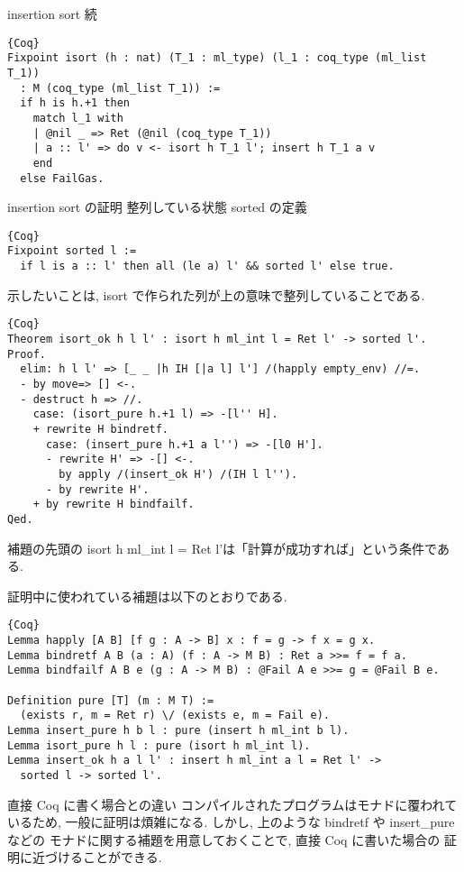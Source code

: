 \documentclass[unicode,mathserif]{beamer}
\begin{document}
\begin{frame}[fragile]
\begin{columns}[T]
    \begin{column}{0.33\columnwidth}
      \begin{block}{insertion sort 続}
        \begin{lstlisting}{Coq}
Fixpoint isort (h : nat) (T_1 : ml_type) (l_1 : coq_type (ml_list T_1))
  : M (coq_type (ml_list T_1)) :=
  if h is h.+1 then
    match l_1 with
    | @nil _ => Ret (@nil (coq_type T_1))
    | a :: l' => do v <- isort h T_1 l'; insert h T_1 a v
    end
  else FailGas.  \end{lstlisting}
      \end{block}
      \begin{block}{insertion sort の証明}
          整列している状態 sorted の定義
        \begin{lstlisting}{Coq}
Fixpoint sorted l :=
  if l is a :: l' then all (le a) l' && sorted l' else true.  \end{lstlisting}
          示したいことは, isort で作られた列が上の意味で整列していることである. 
        \begin{lstlisting}{Coq}
Theorem isort_ok h l l' : isort h ml_int l = Ret l' -> sorted l'.
Proof.
  elim: h l l' => [_ _ |h IH [|a l] l'] /(happly empty_env) //=.
  - by move=> [] <-.
  - destruct h => //.
    case: (isort_pure h.+1 l) => -[l'' H].
    + rewrite H bindretf.
      case: (insert_pure h.+1 a l'') => -[l0 H'].
      - rewrite H' => -[] <-.
        by apply /(insert_ok H') /(IH l l'').
      - by rewrite H'.
    + by rewrite H bindfailf.
Qed.  \end{lstlisting}
補題の先頭の isort h ml\_int l = Ret l'は「計算が成功すれば」という条件である.

        証明中に使われている補題は以下のとおりである. 
        \begin{lstlisting}{Coq}
Lemma happly [A B] [f g : A -> B] x : f = g -> f x = g x.
Lemma bindretf A B (a : A) (f : A -> M B) : Ret a >>= f = f a.
Lemma bindfailf A B e (g : A -> M B) : @Fail A e >>= g = @Fail B e.

Definition pure [T] (m : M T) :=
  (exists r, m = Ret r) \/ (exists e, m = Fail e).
Lemma insert_pure h b l : pure (insert h ml_int b l).
Lemma isort_pure h l : pure (isort h ml_int l).
Lemma insert_ok h a l l' : insert h ml_int a l = Ret l' ->
  sorted l -> sorted l'.  \end{lstlisting}
      \end{block}
      \begin{block}{直接 Coq に書く場合との違い}
        コンパイルされたプログラムはモナドに覆われているため, 
        一般に証明は煩雑になる. 
        しかし, 上のような bindretf や insert\_pure などの
        モナドに関する補題を用意しておくことで, 直接 Coq に書いた場合の
        証明に近づけることができる.


\end{block}
\end{column}
\end{columns}
\end{frame}
\end{document}
